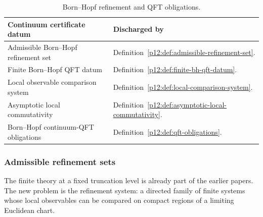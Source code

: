 \documentclass[12pt,a4paper]{article}
\begin{document}
\begin{table}[htbp]
\centering
\small
\begin{tabularx}{\textwidth}{@{}
>{\raggedright\arraybackslash}p{}
>{\raggedright\arraybackslash}X
@{}}
\toprule
\textbf{Continuum certificate datum} & \textbf{Discharged by} \\
\midrule
Admissible Born--Hopf refinement set
& Definition~\ref{p12:def:admissible-refinement-set}. \\

Finite Born--Hopf QFT datum
& Definition~\ref{p12:def:finite-bh-qft-datum}. \\

Local observable comparison system
& Definition~\ref{p12:def:local-comparison-system}. \\

Asymptotic local commutativity
& Definition~\ref{p12:def:asymptotic-local-commutativity}. \\

Born--Hopf continuum-QFT obligations
& Definition~\ref{p12:def:qft-obligations}. \\
\bottomrule
\end{tabularx}
\caption[Born--Hopf refinement and QFT obligations]{Born--Hopf refinement and QFT obligations.}
\label{p12:tab:refinement-qft-obligations}
\end{table}


\subsubsection{Admissible refinement sets}
\label{p12:sec:admissible-refinement-sets}

The finite theory at a fixed truncation level is already part of the earlier papers.  The new problem is the refinement system: a directed family of finite systems whose local observables can be compared on compact regions of a limiting Euclidean chart.
\end{document}
